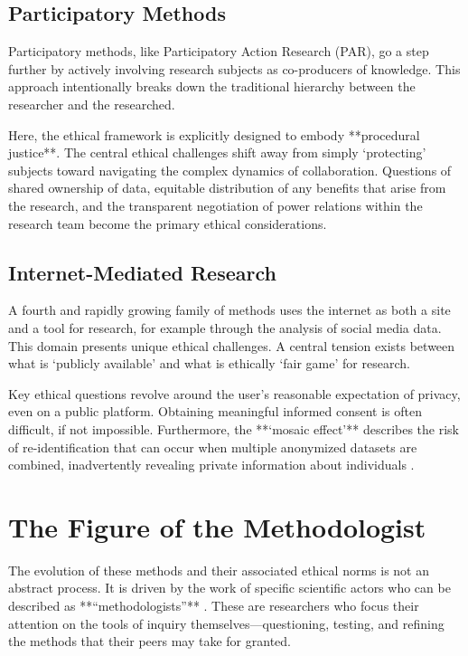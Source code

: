 \documentclass[11pt, letterpaper]{article}
\begin{document}
\subsection{Participatory Methods}

Participatory methods, like Participatory Action Research (PAR), go a step further by actively involving research subjects as co-producers of knowledge. This approach intentionally breaks down the traditional hierarchy between the researcher and the researched.

Here, the ethical framework is explicitly designed to embody **procedural justice**. The central ethical challenges shift away from simply `protecting' subjects toward navigating the complex dynamics of collaboration. Questions of shared ownership of data, equitable distribution of any benefits that arise from the research, and the transparent negotiation of power relations within the research team become the primary ethical considerations.

\subsection{Internet-Mediated Research}

A fourth and rapidly growing family of methods uses the internet as both a site and a tool for research, for example through the analysis of social media data. This domain presents unique ethical challenges. A central tension exists between what is `publicly available' and what is ethically `fair game' for research.

Key ethical questions revolve around the user's reasonable expectation of privacy, even on a public platform. Obtaining meaningful informed consent is often difficult, if not impossible. Furthermore, the **`mosaic effect'** describes the risk of re-identification that can occur when multiple anonymized datasets are combined, inadvertently revealing private information about individuals \citep{ec_2018}.

\section{The Figure of the Methodologist}

The evolution of these methods and their associated ethical norms is not an abstract process. It is driven by the work of specific scientific actors who can be described as **``methodologists''** \citep{nelson_2020}. These are researchers who focus their attention on the tools of inquiry themselves---questioning, testing, and refining the methods that their peers may take for granted.
\end{document}
